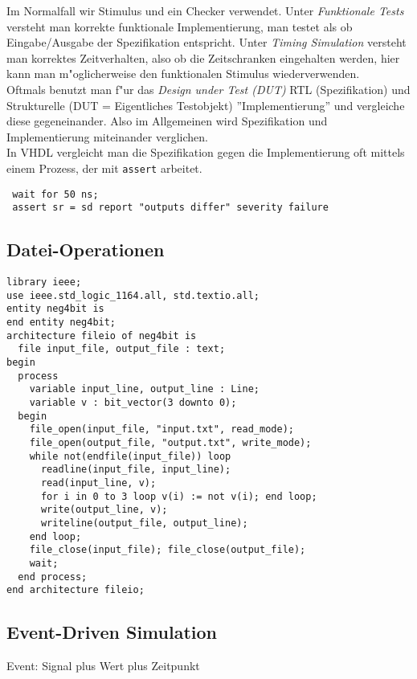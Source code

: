 \documentclass[german, 10pt, a4paper, twocolumn]{scrartcl}
\theoremstyle{definition}
\begin{document}
Im Normalfall wir Stimulus und ein Checker verwendet. Unter \textit{Funktionale Tests} versteht man korrekte funktionale Implementierung, man testet als ob Eingabe/Ausgabe der Spezifikation entspricht. Unter \textit{Timing Simulation} versteht man korrektes Zeitverhalten, also ob die Zeitschranken eingehalten werden, hier kann man m"oglicherweise den funktionalen Stimulus wiederverwenden.\\
Oftmals benutzt man f"ur das \textit{Design under Test (DUT)} RTL (Spezifikation) und Strukturelle (DUT = Eigentliches Testobjekt) ''Implementierung'' und vergleiche diese gegeneinander. Also im Allgemeinen wird Spezifikation und Implementierung miteinander verglichen.\\

In VHDL vergleicht man die Spezifikation gegen die Implementierung oft mittels einem Prozess, der mit \texttt{assert} arbeitet.

\small
\begin{verbatim}
 wait for 50 ns;
 assert sr = sd report "outputs differ" severity failure
\end{verbatim}
\normalsize

\subsection{Datei-Operationen}

\small
\begin{verbatim}
library ieee;
use ieee.std_logic_1164.all, std.textio.all;
entity neg4bit is
end entity neg4bit;
architecture fileio of neg4bit is
  file input_file, output_file : text;
begin
  process
    variable input_line, output_line : Line;
    variable v : bit_vector(3 downto 0);
  begin
    file_open(input_file, "input.txt", read_mode);
    file_open(output_file, "output.txt", write_mode);
    while not(endfile(input_file)) loop
      readline(input_file, input_line);
      read(input_line, v);
      for i in 0 to 3 loop v(i) := not v(i); end loop;
      write(output_line, v);
      writeline(output_file, output_line);
    end loop;
    file_close(input_file); file_close(output_file);
    wait;
  end process;
end architecture fileio;
\end{verbatim}
\normalsize

\subsection{Event-Driven Simulation}

Event: Signal plus Wert plus Zeitpunkt\\
\end{document}
